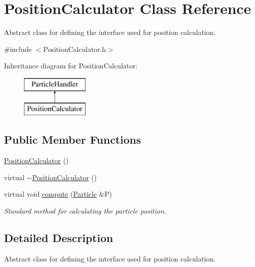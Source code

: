 \hypertarget{classPositionCalculator}{}\section{Position\+Calculator Class Reference}
\label{classPositionCalculator}


Abstract class for defining the interface used for position calculation.  




{\ttfamily \#include $<$Position\+Calculator.\+h$>$}

Inheritance diagram for Position\+Calculator\+:\begin{figure}[H]
\begin{center}
\leavevmode
\includegraphics[height=2.000000cm]{classPositionCalculator}
\end{center}
\end{figure}
\subsection*{Public Member Functions}
\begin{DoxyCompactItemize}
\item 
\hyperlink{classPositionCalculator_a76d6de8b61a7c00e61be4e68699d65bb}{Position\+Calculator} ()
\item 
virtual \hyperlink{classPositionCalculator_add53461d1bce2131853f5cbda77617bb}{$\sim$\+Position\+Calculator} ()
\item 
virtual void \hyperlink{classPositionCalculator_a484e7688db5348d834931a555ce7aadd}{compute} (\hyperlink{classParticle}{Particle} \&P)
\begin{DoxyCompactList}\small\item\em Standard method for calculating the particle position. \end{DoxyCompactList}\end{DoxyCompactItemize}


\subsection{Detailed Description}
Abstract class for defining the interface used for position calculation. 


